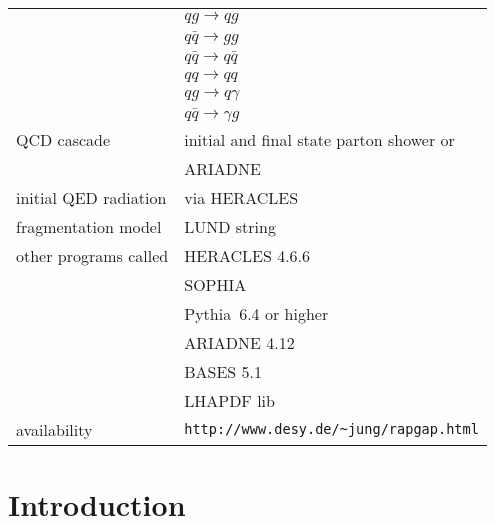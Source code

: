 \documentclass[10pt]{article} \usepackage{dina4}
\def\PYTHIA{{\sc Pythia}}
\begin{document}
\begin{tabular}{l l}
  &  $ q g \rightarrow q g $\\
  &  $ q \bar{q} \rightarrow g g $\\
  &  $ q \bar{q} \rightarrow q \bar{q} $\\
  &  $ q q \rightarrow q q $\\
  &  $ q g \rightarrow q \gamma $\\
  & $ q \bar{q} \rightarrow \gamma g $\\
 QCD cascade & initial and final state parton shower or   \\
             & ARIADNE \\
 initial QED radiation & via HERACLES \\
 fragmentation model & LUND string \\
 other programs called & HERACLES 4.6.6\\
				& SOPHIA \\
                       & \PYTHIA\ 6.4 or higher \\
                       & ARIADNE 4.12  \\
                       & BASES 5.1 \\
			     & LHAPDF lib \\
availability  & \verb+http://www.desy.de/~jung/rapgap.html+ \\
\end{tabular}
\newpage

\section{Introduction}
 
\end{document}
